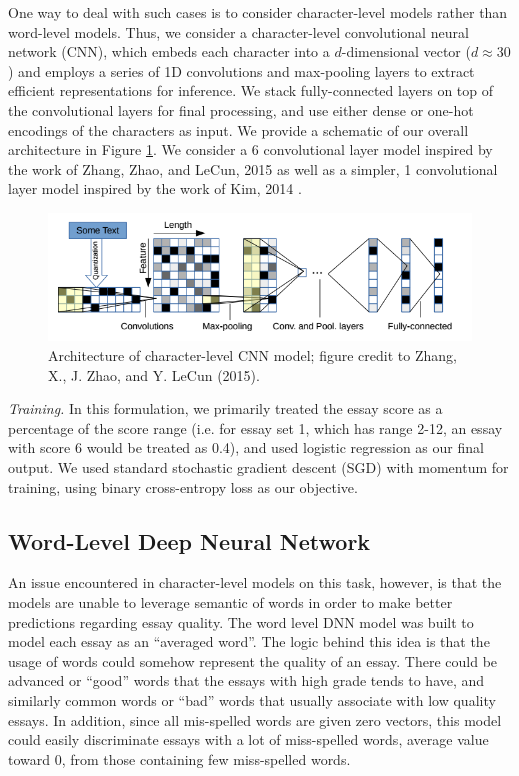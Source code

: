 \documentclass[10pt,psamsfonts]{amsart}
\theoremstyle{definition}
\theoremstyle{remark}
\numberwithin{equation}{section}
\begin{document}
One way to deal with such cases is to consider character-level models rather than word-level models. Thus, we consider a character-level convolutional neural network (CNN), which embeds each character into a $d$-dimensional vector ($d \approx 30$) and employs a series of 1D convolutions and max-pooling layers to extract efficient representations for inference. We stack fully-connected layers on top of the convolutional layers for final processing, and use either dense or one-hot encodings of the characters as input. We provide a schematic of our overall architecture in Figure \ref{fig:cnn}. We consider a 6 convolutional layer model inspired by the work of Zhang, Zhao, and LeCun, 2015 \cite{charnn} as well as a simpler, 1 convolutional layer model inspired by the work of Kim, 2014 \cite{kim14}.

\begin{figure}
	\includegraphics[width=\textwidth]{cnn.png}
	\caption{Architecture of character-level CNN model; figure credit to Zhang, X., J. Zhao, and Y. LeCun (2015).}
	\label{fig:cnn}
\end{figure}

{\em Training.} In this formulation, we primarily treated the essay score as a percentage of the score range (i.e. for essay set 1, which has range 2-12, an essay with score 6 would be treated as 0.4), and used logistic regression as our final output. We used standard stochastic gradient descent (SGD) with momentum for training, using binary cross-entropy loss as our objective.

\subsection*{Word-Level Deep Neural Network}

An issue encountered in character-level models on this task, however, is that the models are unable to leverage semantic of words in order to make better predictions regarding essay quality. The word level DNN model was built to model each essay as an ``averaged word''. The logic behind this idea is that the usage of words could somehow represent the quality of an essay. There could be advanced or ``good'' words that the essays with high grade tends to have, and similarly common words or ``bad'' words that usually associate with low quality essays. In addition, since all mis-spelled words are given zero vectors, this model could easily discriminate essays with a lot of miss-spelled words, average value toward 0, from those containing few miss-spelled words. 
\end{document}
